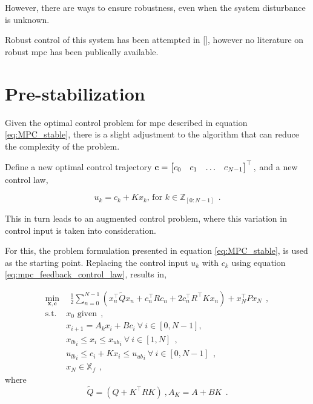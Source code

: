 However, there are ways to ensure robustness, even when the system disturbance is unknown. 

Robust control of this system has been attempted in [], however no literature on robust \acrshort{mpc} has been publically available.





\section{Pre-stabilization}


Given the optimal control problem for \acrshort{mpc} described in equation \eqref{eq:MPC_stable}, there is a slight adjustment to the algorithm that can reduce the complexity of the problem. 

Define a new optimal control trajectory $\mathbf{c} = \begin{bmatrix}c_0 & c_1 & \hdots & c_{N-1}\end{bmatrix}^\top,$ and a new control law, 

\begin{equation}\label{eq:mpc_feedback_control_law}
    u_k = c_k + K x_k \text{, for  } k \in \mathbb{Z}_{[0:N-1]} \: \: .
\end{equation}

This in turn leads to an augmented control problem, where this variation in control input is taken into consideration.

For this, the problem formulation presented in equation \eqref{eq:MPC_stable}, is used as the starting point. Replacing the control input $u_k$ with $c_k$ using equation \eqref{eq:mpc_feedback_control_law}, results in,


\begin{equation}\label{eq:MPC_stable}
    \begin{split}
        \min_{\bm x, \bm c}& \: \: \frac{1}{2} \sum_{n=0}^{{N-1}}(x_{n}^\top \tilde Q x_{n} + c_n^\top R c_n + 2 c_n^\top R^\top K x_n ) + x_N^\top P x_N \: \: , \\
        \text{s.t. }        & x_0 \text{ given} \: \: , \\
                            & x_{i+1} = A_k x_i + Bc_i \: \forall \: i \in [0, N-1],\\
                            &  {x_{lb}}_i \leq x_i \leq  {x_{ub}}_i \: \forall \: i \in [1, N]  \: \: , \\
                            &  {u_{lb}}_i \leq c_i + Kx_i \leq  {u_{ub}}_i \: \forall \: i \in [0, N-1]    \: \: , \\
                           & x_N \in \mathbb{X}_f \: \: ,
    \end{split}
\end{equation}
where
\begin{equation}
  \tilde Q = (Q + K^\top R K) \:, A_K = A + BK \: \: .
\end{equation}

